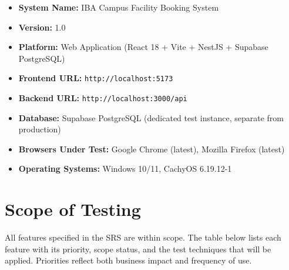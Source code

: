 \documentclass[12pt, a4paper]{article}
\begin{document}
\begin{greybox}
\begin{itemize}[noitemsep]
  \item \textbf{System Name:} IBA Campus Facility Booking System
  \item \textbf{Version:} 1.0
  \item \textbf{Platform:} Web Application (React 18 + Vite + NestJS + Supabase PostgreSQL)
  \item \textbf{Frontend URL:} \texttt{http://localhost:5173}
  \item \textbf{Backend URL:} \texttt{http://localhost:3000/api}
  \item \textbf{Database:} Supabase PostgreSQL (dedicated test instance, separate from production)
  \item \textbf{Browsers Under Test:} Google Chrome (latest), Mozilla Firefox (latest)
  \item \textbf{Operating Systems:} Windows 10/11, CachyOS 6.19.12-1
\end{itemize}
\end{greybox}

\newpage
\section{Scope of Testing}


All features specified in the SRS are within scope. The table below lists each feature with its priority, scope status, and the test techniques that will be applied. Priorities reflect both business impact and frequency of use.
\end{document}
